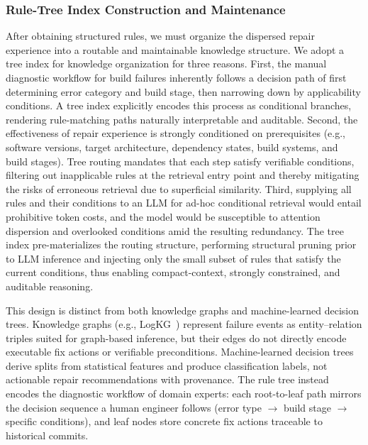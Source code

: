 \documentclass[sigconf,anonymous]{acmart}
\begin{document}
\subsubsection{Rule-Tree Index Construction and Maintenance}

After obtaining structured rules, we must organize the dispersed repair experience into a routable and maintainable knowledge structure. We adopt a tree index for knowledge organization for three reasons. First, the manual diagnostic workflow for build failures inherently follows a decision path of first determining error category and build stage, then narrowing down by applicability conditions. A tree index explicitly encodes this process as conditional branches, rendering rule-matching paths naturally interpretable and auditable. Second, the effectiveness of repair experience is strongly conditioned on prerequisites (e.g., software versions, target architecture, dependency states, build systems, and build stages). Tree routing mandates that each step satisfy verifiable conditions, filtering out inapplicable rules at the retrieval entry point and thereby mitigating the risks of erroneous retrieval due to superficial similarity. Third, supplying all rules and their conditions to an LLM for ad-hoc conditional retrieval would entail prohibitive token costs, and the model would be susceptible to attention dispersion and overlooked conditions amid the resulting redundancy. The tree index pre-materializes the routing structure, performing structural pruning prior to LLM inference and injecting only the small subset of rules that satisfy the current conditions, thus enabling compact-context, strongly constrained, and auditable reasoning.

This design is distinct from both knowledge graphs and machine-learned decision trees. Knowledge graphs (e.g., LogKG~\cite{sui2023logkg}) represent failure events as entity--relation triples suited for graph-based inference, but their edges do not directly encode executable fix actions or verifiable preconditions. Machine-learned decision trees derive splits from statistical features and produce classification labels, not actionable repair recommendations with provenance. The rule tree instead encodes the diagnostic workflow of domain experts: each root-to-leaf path mirrors the decision sequence a human engineer follows (error type $\to$ build stage $\to$ specific conditions), and leaf nodes store concrete fix actions traceable to historical commits.
\end{document}

